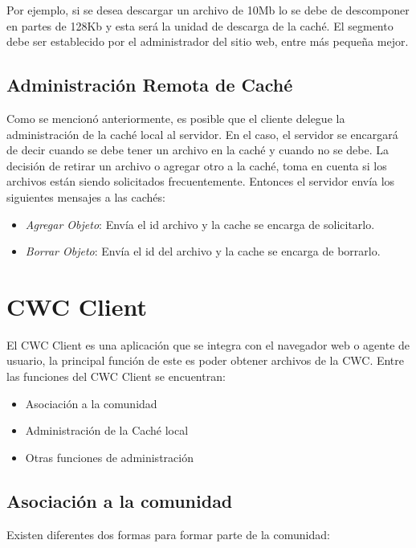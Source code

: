 Por ejemplo, si se desea descargar un archivo de 10Mb lo se debe de descomponer en partes de 128Kb y esta será la unidad de descarga de la caché. El segmento debe ser establecido por el administrador del sitio web, entre más pequeña mejor.

\subsection{Administración Remota de Caché}

Como se mencionó anteriormente, es posible que el cliente delegue la administración de la caché local al servidor. En el caso, el servidor se encargará de decir cuando se debe tener un archivo en la caché y cuando no se debe. La decisión de retirar un archivo o agregar otro a la caché, toma en cuenta si los archivos están siendo solicitados frecuentemente. Entonces el servidor envía los siguientes mensajes a las cachés:

\begin{itemize}
\item \textit{Agregar Objeto}: Envía el id archivo y la cache se encarga de solicitarlo.
\item \textit{Borrar Objeto}: Envía el id del archivo y la cache se encarga de borrarlo.
\end{itemize}

\section{CWC Client}
El CWC Client es una aplicación que se integra con el navegador web o agente de usuario, la principal función de este es poder obtener archivos de la CWC.  Entre las funciones del CWC Client se encuentran:

\begin{itemize}
\item Asociación a la comunidad
\item Administración de la Caché local
\item Otras funciones de administración
\end{itemize}

\subsection{Asociación a la comunidad}

Existen diferentes dos formas para formar parte de la comunidad:

